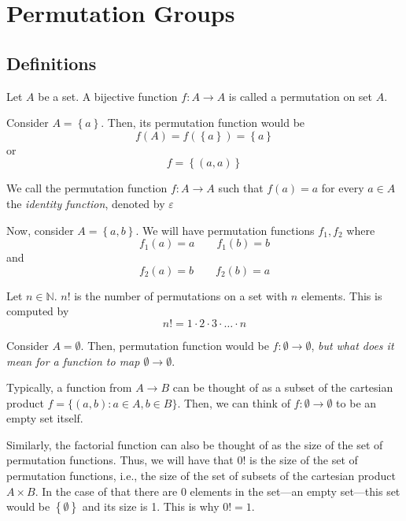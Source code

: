 \chapter{Permutation Groups}

\section{Definitions}

\begin{definition}[Permutation]
    Let \(A\) be a set. A bijective function \(f : A \to A\) is called a permutation on set \(A\).
\end{definition}

\begin{nexample}
    Consider \(A = \left\{a\right\}\). Then, its permutation function would be 
    \[
        f(A) = f(\left\{a\right\}) = \left\{a\right\}
    \]
    or
    \[
        f = \left\{(a, a)\right\}
    \]
\end{nexample}

\begin{remark}
    We call the permutation function \(f: A \to A\) such that \(f(a) = a\) for every \(a \in A\) the \textit{identity function}, denoted by \(\varepsilon\)
\end{remark}

\begin{nexample}
    Now, consider \(A = \left\{a, b\right\}\). We will have permutation functions \(f_1, f_2\) where
    \[
        f_1(a) = a \qquad f_1(b) = b
    \]
    and
    \[
        f_2(a) = b \qquad f_2(b) = a
    \]
\end{nexample}

\begin{definition}[Factorial]
    Let \(n \in \mathbb{N}\). \(n!\) is the number of permutations on a set with \(n\) elements. This is computed by
    \[
        n! = 1 \cdot 2 \cdot 3 \cdot \ldots \cdot n
    \]
\end{definition}

\begin{nexample}
    Consider \(A = \emptyset\). Then, permutation function would be \(f: \emptyset \to \emptyset\), \textit{but what does it mean for a function to map \(\emptyset \to \emptyset\)}.

    Typically, a function from \(A \to B\) can be thought of as a subset of the cartesian product \(f = \{(a, b): a \in A, b \in B\}\). Then, we can think of \(f: \emptyset \to \emptyset\) to be an empty set itself.

    Similarly, the factorial function can also be thought of as the size of the set of permutation functions. Thus, we will have that \(0!\) is the size of the set of permutation functions, i.e., the size of the set of subsets of the cartesian product \(A \times B\). In the case of that there are 0 elements in the set---an empty set---this set would be \(\left\{\emptyset\right\}\) and its size is 1. This is why \(0! = 1\).
\end{nexample}

